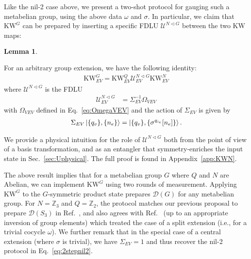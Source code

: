 \documentclass[nofootinbib,prx,twocolumn,showpacs,superscriptaddress,notitlepage,amsmath,amssymb]{revtex4-2}
\theoremstyle{definition}
\def\KW{\text{KW}}
\def\ket#1{\mathinner{|{#1}\rangle}}
\def\ZZ{\mathbb Z}
\newtheorem{lemma}[theorem]{Lemma}
\begin{document}
Like the nil-2 case above, we present a two-shot protocol for gauging such a metabelian group, using the above data $\omega$ and $\sigma$. In particular, we claim that $\KW^{G}$ can be prepared by inserting a specific FDLU $\mathcal U^{N \triangleleft G}$ between the two KW maps: 
\begin{lemma}
\begin{shaded}
For an arbitrary group extension, we have the following identity:
    \begin{align}
    \KW^G_{EV} = \KW^Q_{EV} \mathcal U^{N \triangleleft G}_{EV} \KW^N_{EV} \label{eq:2stepfull}
\end{align}
where $\mathcal U^{N \triangleleft G}$ is the FDLU
\begin{align}
     \mathcal U^{N \triangleleft G}_{EV} &= \Sigma_{EV}^{-1} \Omega_{VEV}
     \label{eq:UasFDLU}
\end{align}
with $\Omega_{VEV}$ defined in Eq.~\eqref{eq:OmegaVEV} and the action of $\Sigma_{EV}$ is given by
\begin{align}
    \Sigma_{EV} \ket{\{q_v\},\{n_e\}}= \ket{\{q_v\},\{\sigma^{q_{i_e}}[n_e]\}}.
\end{align}
\end{shaded}
\label{lem:metabelian}
\end{lemma}
 We provide a physical intuition for the role of $\mathcal U^{N \triangleleft G}$ both from the point of view of a basis transformation, and as an entangler that symmetry-enriches the input state in Sec.~\ref{sec:Uphysical}. The full proof is found in Appendix~\ref{app:KWN}.

The above result implies that for a metabelian group $G$ where $Q$ and $N$ are Abelian, we can implement $\KW^G$ using two rounds of measurement. Applying  $\KW^G$ to the $G$-symmetric product state prepares $\mathcal D(G)$ for any metabelian group. For $N=\ZZ_3$ and $Q=\ZZ_2$, the protocol matches our previous proposal to prepare $\mathcal D(S_3)$ in Ref.~, and also agrees with Ref.~ (up to an appropriate inversion of group elements) which treated the case of a split extension (i.e., for a trivial cocycle $\omega$). We further remark that in the special case of a central extension (where $\sigma$ is trivial), we have $\Sigma_{EV} = 1$ and thus recover the nil-2 protocol in Eq.~\eqref{eq:2stepnil2}.
\end{document}
